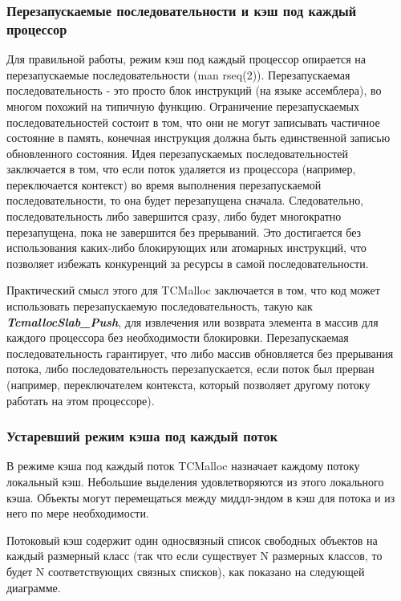 \subsubsection{Перезапускаемые последовательности и кэш под каждый процессор}

Для правильной работы, режим кэш под каждый процессор опирается на перезапускаемые последовательности (man rseq(2)). Перезапускаемая последовательность - это просто блок инструкций (на языке ассемблера), во многом похожий на типичную функцию. Ограничение перезапускаемых последовательностей состоит в том, что они не могут записывать частичное состояние в память, конечная инструкция должна быть единственной записью обновленного состояния. Идея перезапускаемых последовательностей заключается в том, что если поток удаляется из процессора (например, переключается контекст) во время выполнения перезапускаемой последовательности, то она будет перезапущена сначала. Следовательно, последовательность либо завершится сразу, либо будет многократно перезапущена, пока не завершится без прерываний. Это достигается без использования каких-либо блокирующих или атомарных инструкций, что позволяет избежать конкуренций за ресурсы в самой последовательности.

Практический смысл этого для TCMalloc заключается в том, что код может использовать перезапускаемую последовательность, такую как \textbf{\textit{TcmallocSlab\_Push}}, для извлечения или возврата элемента в массив для каждого процессора без необходимости блокировки. Перезапускаемая последовательность гарантирует, что либо массив обновляется без прерывания потока, либо последовательность перезапускается, если поток был прерван (например, переключателем контекста, который позволяет другому потоку работать на этом процессоре).

\subsubsection{Устаревший режим кэша под каждый поток}

В режиме кэша под каждый поток TCMalloc назначает каждому потоку локальный кэш. Небольшие выделения удовлетворяются из этого локального кэша. Объекты могут перемещаться между миддл-эндом в кэш для потока и из него по мере необходимости.

Потоковый кэш содержит один односвязный список свободных объектов на каждый размерный класс (так что если существует N размерных классов, то будет N соответствующих связных списков), как показано на следующей диаграмме.

